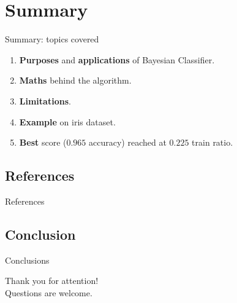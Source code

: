 \documentclass[11pt, aspectratio=169]{beamer}
\newcommand{\emphtext}[1]{\color{black} \textbf{#1}}
\begin{document}
	\section{Summary}
	\begin{frame}{Summary: topics covered}
		\begin{enumerate}
			\item \emphtext{Purposes} and \emphtext{applications} of Bayesian Classifier.\\[10pt]
			\item \emphtext{Maths} behind the algorithm. \\[10pt]
			\item \emphtext{Limitations}. \\[10pt]
			\item \emphtext{Example} on iris dataset.\\[10pt]
			\item \emphtext{Best} score ($\bm{0.965}$ accuracy) reached at $\bm{0.225}$ train ratio.
		\end{enumerate}
	\end{frame}
    
    \subsection{References}
    \begin{frame}{References}
    	
    	
    \end{frame}
    
    \subsection{Conclusion}
    \begin{frame}{Conclusions}
    	\begin{center}
    		{\Huge Thank you for attention!}\\
    		\vspace{10pt}
    		{\Large Questions are welcome.}
    	\end{center}
    \end{frame}
\end{document}
